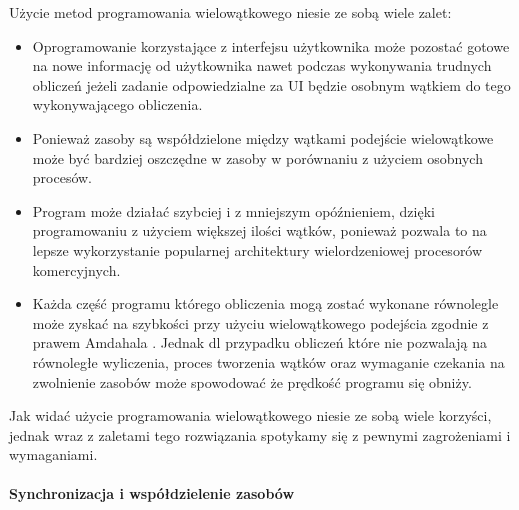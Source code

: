 \documentclass[a4paper,12pt]{article}
\begin{document}
Użycie metod programowania wielowątkowego niesie ze sobą wiele zalet:
\begin{itemize}
        \item Oprogramowanie korzystające z interfejsu użytkownika może pozostać gotowe na nowe informację od użytkownika nawet podczas wykonywania trudnych obliczeń jeżeli zadanie odpowiedzialne za UI będzie osobnym wątkiem do tego wykonywającego obliczenia.
        \item Ponieważ zasoby są współdzielone między wątkami podejście wielowątkowe może być bardziej oszczędne w zasoby w porównaniu z użyciem osobnych procesów. 
        \item Program może działać szybciej i z mniejszym opóźnieniem, dzięki programowaniu z użyciem większej ilości wątków, ponieważ pozwala to na lepsze wykorzystanie popularnej architektury wielordzeniowej procesorów komercyjnych. 
        \item Każda część programu którego obliczenia mogą zostać wykonane równolegle może zyskać na szybkości przy użyciu wielowątkowego podejścia zgodnie z prawem Amdahala \cite{arch}. 
        Jednak dl przypadku obliczeń które nie pozwalają na równoległe wyliczenia, proces tworzenia wątków oraz wymaganie czekania na zwolnienie zasobów może spowodować że prędkość programu się obniży.
\end{itemize}
Jak widać użycie programowania wielowątkowego niesie ze sobą wiele korzyści,
jednak wraz z zaletami tego rozwiązania spotykamy się z pewnymi zagrożeniami i wymaganiami.

\paragraph{Synchronizacja i współdzielenie zasobów}
\end{document}
